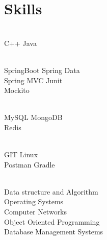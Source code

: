 \documentclass[]{deedy-resume-openfont}
\begin{document}
\begin{minipage}[t]{0.33\textwidth}

\section{Skills}
\sectionsep
{}\\
\textbullet{} C++ \textbullet{} Java 
   
\sectionsep

\\
 \textbullet{} SpringBoot 
  \textbullet{} Spring Data \\
 \textbullet{} Spring MVC
 \textbullet{} Junit\\
 \textbullet{} Mockito \\
 \sectionsep


\\
 \textbullet{} MySQL 
\textbullet{} MongoDB \\
\textbullet{} Redis
\sectionsep


\\
\textbullet{} GIT \textbullet{}Linux \\
\textbullet{}Postman \textbullet{} Gradle


\sectionsep


\\

\textbullet{}Data structure and Algorithm  \\
\textbullet{}Operating Systems\\
\textbullet{}Computer Networks\\
\textbullet{}Object Oriented Programming\\
\textbullet{}Database Management Systems \\
\sectionsep



\end{minipage}
\end{document}
